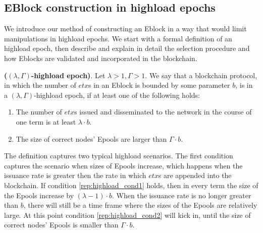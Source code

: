 \subsection{EBlock construction in highload epochs}
We introduce our method of constructing an Eblock in a way that would limit manipulations in highload epochs. We start with a formal definition of an highload epoch, then describe and explain in detail the selection procedure and how Eblocks are validated and incorporated in the blockchain.

\begin{definition}{\textbf{($(\lambda,\Gamma)$-highload epoch)}}\label{def:highload}. 
Let $\lambda>1,\Gamma>1$. We say that a blockchain protocol, in which the number of $etx$s in an Eblock is bounded by some parameter $b$, is in a $(\lambda,\Gamma)$-highload epoch, if at least one of the following holds: 
	\begin{enumerate}
    	\item \label{rep:highload_cond1}The number of $etx$s issued and disseminated to the network in the course of one term is at least $\lambda \cdot b$.
        \item \label{rep:highload_cond2} The size of correct nodes' Epools are larger than $\Gamma \cdot b$. 
    \end{enumerate}
\end{definition}

The definition captures two typical highload scenarios. The first condition captures the scenario when sizes of Epools increase, which happens when the issuance rate is greater then the rate in which $etx$s are appended into the blockchain. If condition \ref{rep:highload_cond1} holds, then in every term the size of the Epools increase by $(\lambda-1)\cdot b$. When the issuance rate is no longer greater than $b$, there will still be a time frame where the sizes of the Epools are relatively large. At this point condition \ref{rep:highload_cond2} will kick in, until the size of correct nodes' Epools is smaller than $\Gamma \cdot b$.


